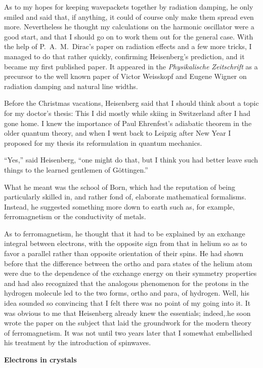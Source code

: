 \documentclass[12pt]{article}
\begin{document}
As to my hopes for keeping wavepackets together by radiation damping, he only smiled and said that, if anything, it could of course only make them spread even more. Nevertheless he thought my calculations on the harmonic oscillator were a good start, and that I should go on to work them out for the general case. With the help of P.~A.~M.~Dirac's paper on radiation effects and a few more tricks, I managed to do that rather quickly, confirming Heisenberg's prediction, and it became my first published paper. It appeared in the {\it Physikalische Zeitschrift} as a precursor to the well known paper of Victor Weisskopf and Eugene Wigner on radiation damping and natural line widths.

Before the Christmas vacations, Heisenberg said that I should think about a topic for my doctor's thesis: This I did mostly while skiing in Switzerland after I had gone home. I knew the importance of Paul Ehrenfest's adiabatic theorem in the older quantum theory, and when I went back to Leipzig after New Year I proposed for my thesis its reformulation in quantum mechanics.

``Yes,'' said Heisenberg, ``one might do that, but I think you had better leave such things to the learned gentlemen of G\"ottingen.''

What he meant was the school of Born, which had the reputation of being particularly skilled in, and rather fond of, elaborate mathematical formalisms. Instead, he suggested something more
down to earth such as, for example, ferromagnetism or the conductivity of metals.

As to ferromagnetism, he thought that it had to be explained by an exchange integral between electrons, with the opposite sign from that in helium so as to favor a parallel rather than opposite orientation of their spins. He had shown before that the difference between the ortho and para states of the helium atom were due to the dependence of the exchange energy on their symmetry properties and had also recognized that the analogous phenomenon for the protons in the hydrogen molecule led to the two forms, ortho and para, of hydrogen. Well, his idea sounded so convincing that I felt there was no point of my going into it. It was obvious to me that Heisenberg already knew the essentials; indeed,.he soon wrote the paper on the subject that laid the groundwork for the modern theory of ferromagnetism. It was not until two years later that I somewhat embellished his treatment by the introduction of spinwaves.

\bigskip
\noindent
{\bf Electrons in crystals}
\end{document}
